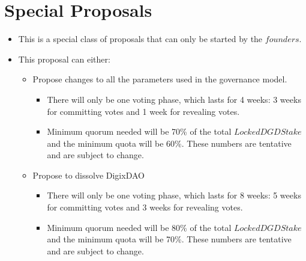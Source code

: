 \documentclass[11pt,a4paper,titlepage]{article}
\begin{document}
\section{Special Proposals}{
	\begin{itemize}
		\item This is a special class of proposals that can only be started by the $founders$.
		\item This proposal can either:
		\begin{itemize}
			\item Propose changes to all the parameters used in the governance model.
			\begin{itemize}
				\item There will only be one voting phase, which lasts for 4 weeks: 3 weeks for committing votes and 1 week for revealing votes.
				\item Minimum quorum needed will be 70\% of the total $LockedDGDStake$ and the minimum quota will be 60\%. These numbers are tentative and are subject to change.
			\end{itemize}
			\item Propose to dissolve DigixDAO
			\begin{itemize}
				\item There will only be one voting phase, which lasts for 8 weeks: 5 weeks for committing votes and 3 weeks for revealing votes.
				\item Minimum quorum needed will be 80\% of the total $LockedDGDStake$ and the minimum quota will be 70\%. These numbers are tentative and are subject to change.
			\end{itemize}
		\end{itemize} 
	\end{itemize}	
}
\end{document}
